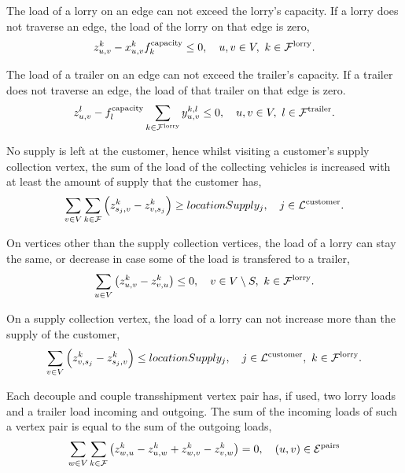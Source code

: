 The load of a lorry on an edge can not exceed the lorry's capacity.
If a lorry does not traverse an edge, the load of the lorry on that edge is zero,
\begin{align}
  z_{u,v}^k  - x^{k}_{u,v}  f_k^{\rm capacity}  \leq 0, \quad
  u,v \in V,
  \ k \in \mathcal F^{\rm lorry}.
\end{align}



The load of a trailer on an edge can not exceed the trailer's capacity. If a trailer does not traverse an edge, the load of that trailer on that edge is zero.
\begin{align}
  z_{u,v}^l  - f_l^{\rm capacity}  \sum_{ k \in \mathcal F^{\rm lorry} } y^{k,l}_{u,v}   \leq 0, \quad
  u,v \in V,
  \ l \in \mathcal F^{\rm trailer}.
\end{align}



No supply is left at the customer, hence
whilst visiting a customer's supply collection vertex, the sum of the load of the collecting vehicles is increased with at least the amount of supply that the customer has,
\begin{align}
  \label{eq:supply}
  \sum_{v \in V}
  \sum_{ k \in \mathcal F }
  \left(
    z^k_{s_j,v}
  -
    z^k_{v,s_j}
  \right)
    \geq locationSupply_j, \quad
    j \in \mathcal L^{\rm customer}.
\end{align}






On vertices other than the supply collection vertices, the load of a lorry can stay the same, or decrease in case some of the load is transfered to a trailer,
\begin{align}
  \sum_{u \in V} \left( z^k_{u,v} - z^k_{v,u} \right)  \leq 0, \quad
  v \in V \setminus S,
  \ k \in \mathcal F^{\rm lorry}.
\end{align}


On a supply collection vertex, the load of a lorry can not increase more than the supply of the customer,
\begin{align}
  \sum_{v \in V} \left( z^k_{v,s_j} - z^k_{s_j,v} \right)  \leq locationSupply_j, \quad
  j \in \mathcal L^{\rm customer},
  \ k \in \mathcal F^{\rm lorry}.
\end{align}

Each decouple and couple transshipment vertex pair has, if used, two lorry loads and a trailer load incoming and outgoing.
The sum of the incoming loads of such a vertex pair is equal to the sum of the  outgoing loads,
\begin{align}
  \sum_{w \in V}
  \sum_{k \in \mathcal F}
  \left(
  z^k_{w,u} -  z^k_{u,w}  + z^k_{w,v} - z^k_{v,w}
  \right)
  = 0,  \quad
  (u,v) \in \mathcal E^{\rm pairs}
\end{align}





